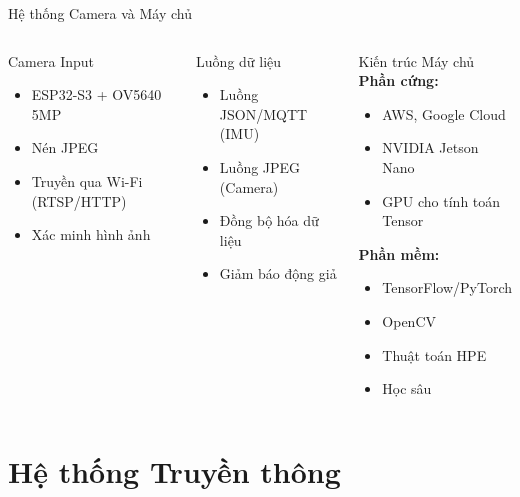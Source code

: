 \begin{frame}{Hệ thống Camera và Máy chủ}
\begin{columns}
\begin{block}{Camera Input}
\begin{itemize}
\item ESP32-S3 + OV5640 5MP
\item Nén JPEG
\item Truyền qua Wi-Fi (RTSP/HTTP)
\item Xác minh hình ảnh
\end{itemize}
\end{block}

\begin{block}{Luồng dữ liệu}
\begin{itemize}
\item Luồng JSON/MQTT (IMU)
\item Luồng JPEG (Camera)
\item Đồng bộ hóa dữ liệu
\item Giảm báo động giả
\end{itemize}
\end{block}

\begin{block}{Kiến trúc Máy chủ}
\textbf{Phần cứng:}
\begin{itemize}
\item AWS, Google Cloud
\item NVIDIA Jetson Nano
\item GPU cho tính toán Tensor
\end{itemize}

\textbf{Phần mềm:}
\begin{itemize}
\item TensorFlow/PyTorch
\item OpenCV
\item Thuật toán HPE
\item Học sâu
\end{itemize}
\end{block}
\end{columns}
\end{frame}

\section{Hệ thống Truyền thông}

